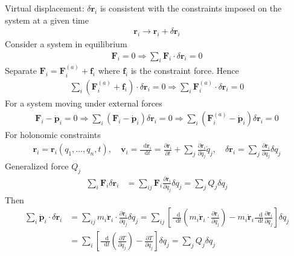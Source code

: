 \documentclass[twoside,11pt]{article}
\renewcommand*\d{\mathop{}\!\mathrm{d}}
\theoremstyle{definition}
\theoremstyle{remark}
\begin{document}
Virtual displacement: $\delta\mathbf{r}_i$
is consistent with the constraints imposed on the system at
a given time
\begin{align}
    \mathbf{r}_i \rightarrow 
    \mathbf{r}_i + \delta\mathbf{r}_i
\end{align}
Consider a system in equilibrium
\begin{align}
    \mathbf{F}_i = 0
    \Rightarrow
    \sum_i\mathbf{F}_i\cdot\delta\mathbf{r}_i = 0
\end{align}
Separate $\mathbf{F}_i = \mathbf{F}_i^(a) + \mathbf{f}_i$
where $\mathbf{f}_i$ is the constraint force.
Hence
\begin{align}
    \sum_i(\mathbf{F}_i^{(a)} + \mathbf{f}_i)
    \cdot\delta\mathbf{r}_i = 0
    \Rightarrow
    \sum_i\mathbf{F}_i^{(a)}\cdot\delta\mathbf{r}_i = 0
\end{align}
For a system moving under external forces
\begin{align}
    \mathbf{F}_i - \dot{\mathbf{p}}_i = 0
    \Rightarrow
    \sum_i(\mathbf{F}_i - \dot{\mathbf{p}}_i)\delta\mathbf{r}_i = 0
    \Rightarrow
    \sum_i(\mathbf{F}_i^{(a)} - \dot{\mathbf{p}}_i)\delta\mathbf{r}_i = 0
\end{align}
For holonomic constraints
\begin{align}
    \mathbf{r}_i = \mathbf{r}_i(q_1,\dots,q_n,t),\quad
    \mathbf{v}_i = \frac{\d\mathbf{r}_i}{\d t}
    = \frac{\partial \mathbf{r}_i}{\partial t}
    + \sum_j\frac{\partial\mathbf{r}_i}{\partial q_j}\dot{q}_j,\quad
    \delta\mathbf{r}_i = \sum_j\frac{\partial\mathbf{r}_i}{\partial q_j}
    \delta q_j
\end{align}
Generalized force $Q_j$
\begin{align}
    \sum_i\mathbf{F}_i\delta\mathbf{r}_i
    &= \sum_{ij}\mathbf{F}_i\frac{\partial\mathbf{r}_i}{\partial q_j}\delta q_j
    = \sum_j Q_j\delta q_j
\end{align}
Then
\begin{align}
    \sum_i\dot{\mathbf{p}}_i\cdot\delta\mathbf{r}_i
    &= \sum_{ij}m_i\ddot{\mathbf{r}}_i
    \cdot\frac{\partial \mathbf{r}_i}{\partial q_j}\delta q_j
    = 
    \sum_{ij}\left[
        \frac{\d}{\d t}
        \left(m_i\dot{\mathbf{r}}_i\cdot\frac{\partial\mathbf{r}_i}{\partial q_j}\right)
        - m_i\dot{\mathbf{r}}_i\frac{\d}{\d t}\frac{\partial\mathbf{r}_i}{\partial q_j}
    \right]\delta q_j\\
    &= 
    \sum_i\left[
        \frac{\d }{\d t}\left(\frac{\partial T}{\partial\dot{q}_j}\right)
        - \frac{\partial T}{\partial q_j}
    \right]\delta q_j
    = \sum_j Q_j\delta q_j\\
\end{align}
\end{document}
